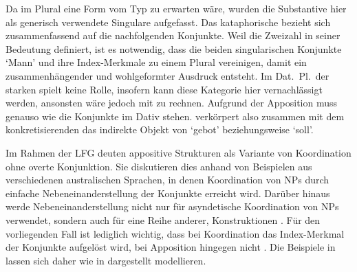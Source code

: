Da im Plural eine Form vom Typ  zu erwarten wäre, wurden die
Substantive hier als generisch verwendete Singulare
aufgefasst. Das kataphorische  bezieht sich zusammenfassend auf die
nachfolgenden Konjunkte. Weil  die Zweizahl in seiner Bedeutung
definiert, ist es notwendig, dass die beiden singularischen Konjunkte
 `Mann' und  ihre Index-Merkmale zu einem Plural
vereinigen, damit ein zusammenhängender und wohlgeformter Ausdruck entsteht. Im
Dat.~Pl.\ der starken  spielt  keine Rolle,
insofern kann diese Kategorie hier vernachlässigt werden, ansonsten wäre jedoch
mit  zu rechnen. Aufgrund der Apposition
muss  genauso wie die Konjunkte im Dativ stehen. 
verkörpert also zusammen mit dem konkretisierenden  das
indirekte Objekt von  `gebot' beziehungsweise  `soll'.

Im Rahmen der LFG deuten \citet{sadlernordlinger2006} appositive
Strukturen als Variante von Koordination ohne overte Konjunktion. Sie
diskutieren dies anhand von Beispielen aus verschiedenen australischen
Sprachen, in denen Koordination von NPs durch einfache Nebeneinanderstellung
der Konjunkte erreicht wird. Darüber hinaus werde Nebeneinanderstellung nicht
nur für asyndetische Koordination von NPs verwendet, sondern auch für eine
Reihe anderer,  Konstruktionen
\autocite[440--441]{sadlernordlinger2006}. Für den vorliegenden Fall ist
lediglich wichtig, dass bei Koordination das Index-Merkmal der Konjunkte
aufgelöst wird, bei Apposition hingegen nicht
\autocite[444]{sadlernordlinger2006}. Die Beispiele in
 lassen sich daher wie in
 dargestellt modellieren.

